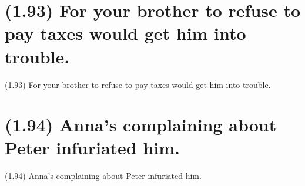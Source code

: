 \documentclass{article}
\begin{document}
\clearpage

%
%

\section*{(1.93) For your brother to refuse to pay taxes would get him into trouble.}

\bigbreak
\begin{enumerate*}
\item[(1.93)] For your brother to refuse to pay taxes would get him into trouble.
\end{enumerate*}
\bigbreak

\bigbreak
\begin{minipage}{\textwidth}
\end{minipage}
\bigbreak

\clearpage

%
%

\section*{(1.94) Anna's complaining about Peter infuriated him.}

\bigbreak
\begin{enumerate*}
\item[(1.94)] Anna's complaining about Peter infuriated him.
\end{enumerate*}
\bigbreak

\bigbreak
\begin{minipage}{\textwidth}
\end{minipage}
\bigbreak
\end{document}
